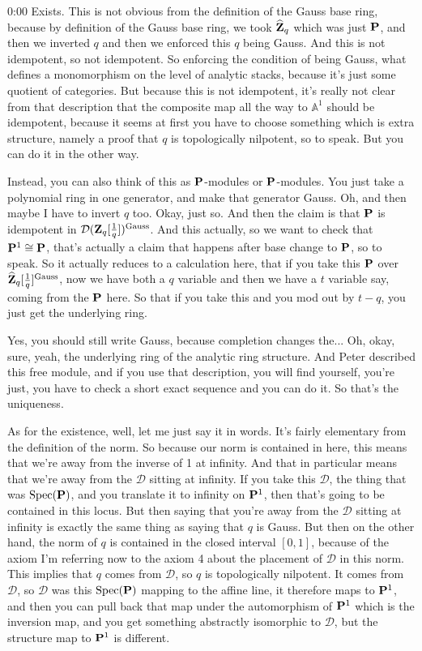 \begin{unfinished}{0:00}
Exists. This is not obvious from the definition of the Gauss base ring, because by definition of the Gauss base ring, we took $\widehat\Z_q$ which was just $\P$, and then we inverted $q$ and then we enforced this $q$ being Gauss. And this is not idempotent, so not idempotent. So enforcing the condition of being Gauss, what defines a monomorphism on the level of analytic stacks, because it's just some quotient of categories. But because this is not idempotent, it's really not clear from that description that the composite map all the way to $\mathbb{A}^1$ should be idempotent, because it seems at first you have to choose something which is extra structure, namely a proof that $q$ is topologically nilpotent, so to speak. But you can do it in the other way.

Instead, you can also think of this as $\P$-modules or $\P$-modules. You just take a polynomial ring in one generator, and make that generator Gauss. Oh, and then maybe I have to invert $q$ too. Okay, just so. And then the claim is that $\P$ is idempotent in $\mathcal{D}(\Z_q[\frac{1}{q}])^{\mathrm{Gauss}}$. And this actually, so we want to check that $\P^1 \cong \P$, that's actually a claim that happens after base change to $\P$, so to speak. So it actually reduces to a calculation here, that if you take this $\P$ over $\widehat\Z_q[\frac{1}{q}]^{\mathrm{Gauss}}$, now we have both a $q$ variable and then we have a $t$ variable say, coming from the $\P$ here. So that if you take this and you mod out by $t-q$, you just get the underlying ring.

Yes, you should still write Gauss, because completion changes the... Oh, okay, sure, yeah, the underlying ring of the analytic ring structure. And Peter described this free module, and if you use that description, you will find yourself, you're just, you have to check a short exact sequence and you can do it. So that's the uniqueness.

As for the existence, well, let me just say it in words. It's fairly elementary from the definition of the norm. So because our norm is contained in here, this means that we're away from the inverse of 1 at infinity. And that in particular means that we're away from the $\mathcal{D}$ sitting at infinity. If you take this $\mathcal{D}$, the thing that was $\mathrm{Spec}(\P)$, and you translate it to infinity on $\P^1$, then that's going to be contained in this locus. But then saying that you're away from the $\mathcal{D}$ sitting at infinity is exactly the same thing as saying that $q$ is Gauss. But then on the other hand, the norm of $q$ is contained in the closed interval $[0,1]$, because of the axiom I'm referring now to the axiom 4 about the placement of $\mathcal{D}$ in this norm. This implies that $q$ comes from $\mathcal{D}$, so $q$ is topologically nilpotent. It comes from $\mathcal{D}$, so $\mathcal{D}$ was this $\mathrm{Spec}(\P)$ mapping to the affine line, it therefore maps to $\P^1$, and then you can pull back that map under the automorphism of $\P^1$ which is the inversion map, and you get something abstractly isomorphic to $\mathcal{D}$, but the structure map to $\P^1$ is different.


\end{unfinished}
